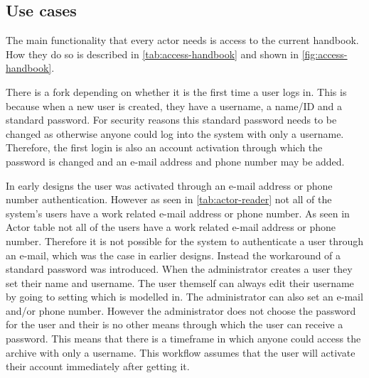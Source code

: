 \subsection{Use cases} \label{sec:usecases}
The main functionality that every actor needs is access to the current handbook. How they do so is described in \cref{tab:access-handbook} and shown in \cref{fig:access-handbook}.




There is a fork depending on whether it is the first time a user logs in.
This is because when a new user is created, they have a username, a name/ID and a standard password.
For security reasons this standard password needs to be changed as otherwise anyone could log into the system with only a username.
Therefore, the first login is also an account activation through which the password is changed and an e-mail address and phone number may be added.





%





%

In early designs the user was activated through an e-mail address or phone number authentication.
However as seen in \cref{tab:actor-reader} not all of the system's users have a work related e-mail address or phone number.
As seen in Actor table not all of the users have a work related e-mail address or phone number.
Therefore it is not possible for the system to authenticate a user through an e-mail, which was the case in earlier designs.
Instead the workaround of a standard password was introduced.
When the administrator creates a user they set their name and username.
The user themself can always edit their username by going to setting which is modelled in.
The administrator can also set an e-mail and/or phone number.
However the administrator does not choose the password for the user and their is no other means through which the user can receive a password.
This means that there is a timeframe in which anyone could access the archive with only a username.
This workflow assumes that the user will activate their account immediately after getting it.

